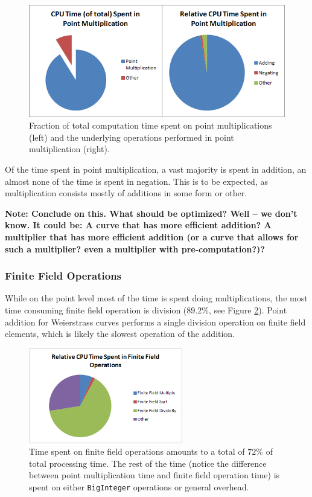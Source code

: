\begin{figure}[htb]
	\centering
	\includegraphics[width=1\textwidth]{performance/point-multiplication--relative-time}
	\caption{Fraction of total computation time spent on point multiplications (left) and the underlying operations performed in point
		multiplication (right).}
	\label{fig:point-multiplication-performance}
\end{figure}

Of the time spent in point multiplication, a vast majority is spent in addition, an almost none of the time is spent in negation. This
is to be expected, as multiplication consists mostly of additions in some form or other.

\textbf{Note: Conclude on this. What should be optimized? Well -- we don't know. It could be:
A curve that has more efficient addition?
A multiplier that has more efficient addition (or a curve that allows for such a multiplier? even a multiplier with pre-computation?)?}

\subsubsection{Finite Field Operations}
\label{sec:performance_components_finitefield}

While on the point level most of the time is spent doing multiplications, the most time consuming finite field operation is division
(\(89.2\%\), see Figure \ref{fig:finite-field-performance}). Point addition for Weierstrass curves performs a single division operation
on finite field elements, which is likely the slowest operation of the addition.

\begin{figure}[htb]
	\centering
	\includegraphics[width=0.6\textwidth]{performance/finite-field--relative-time}
	\caption{Time spent on finite field operations amounts to a total of \(72\%\) of total processing time. The rest of the time (notice the
		difference between point multiplication time and finite field operation time) is spent on either \texttt{BigInteger} operations or 
		general overhead.}
	\label{fig:finite-field-performance}
\end{figure}

